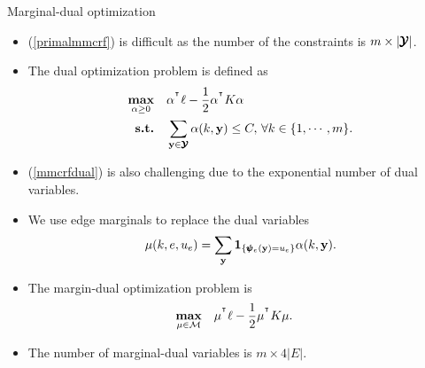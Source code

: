 \documentclass[first=dgreen,second=purple,logo=yellowexc]{aaltoslides}
\begin{document}
%
\begin{frame}{Marginal-dual optimization}
	\begin{itemize}\footnotesize
		\item (\ref{primalmmcrf}) is difficult as the number of the constraints is $m\times|\pmb {\mathcal{Y}}|$.
		\item The dual optimization problem is defined as
		\begin{align}
			\underset{\mathbf {\alpha}\ge0}{\textbf{max}} & \quad \mathbf {\alpha}^{^{\intercal}}\mathbf {\ell} - \frac{1}{2}\mathbf {\alpha}^{^{\intercal}}K\mathbf {\alpha}\label{mmcrfdual}\\
			\textbf{s.t.} & \quad \sum_{\mathbf {y}\in\pmb {\mathcal{Y}}}\alpha(k,\mathbf {y})\le C, \, \forall k\in\{1,\cdots,m\}\nonumber.
		\end{align}
		\item (\ref{mmcrfdual}) is also challenging due to the exponential number of dual variables.
		\item We use edge marginals to replace the dual variables \cite{Taskar04max}
		\begin{align*}
			\mu(k,e,u_e) = \sum_{\mathbf {y}}\mathbf{1}_{\{\pmb \psi_e(\mathbf {y})=u_e\}}\alpha(k,\mathbf {y}). 
		\end{align*}
		\item The margin-dual optimization problem is 
		\begin{align}
			\underset{\mathbf {\mu}\in\mathcal{M}}{\textbf{max}} & \quad \mathbf {\mu}^{^{\intercal}}\ell - \frac{1}{2}\mathbf {\mu}^{^{\intercal}}K\mathbf {\mu}. \label{mmcrfmarginaldual}
		\end{align}
		\item The number of marginal-dual variables is $m\times4|E|$.
	\end{itemize}
\end{frame}
\end{document}
